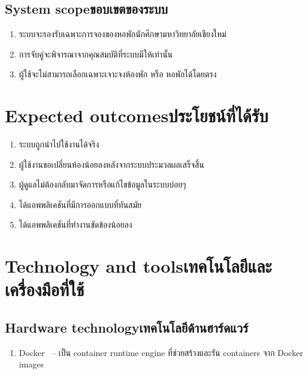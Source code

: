 \subsection{\ifenglish System scope\else ขอบเขตของระบบ\fi}
\begin{enumerate}
    \item ระบบจะรองรับเฉพาะการจองของหอพักนักศึกษามหาวิทยาลัยเชียงใหม่
    \item การจับคู่จะพิจารณาจากคุณสมบัติที่ระบบมีให้เท่านั้น
    \item ผู้ใช้จะไม่สามารถเลือกเฉพาะเจาะจงห้องพัก หรือ หอพักได้โดยตรง
\end{enumerate}

\section{\ifenglish Expected outcomes\else ประโยชน์ที่ได้รับ\fi}
\begin{enumerate}
    \item ระบบถูกนำไปใช้งานได้จริง
    \item ผู้ใช้งานขอเปลี่ยนห้องน้อยลงหลังจากระบบประมวลผลเสร็จสิ้น
    \item ผู้ดูแลไม่ต้องกลับมาจัดการหรือแก้ไขข้อมูลในระบบบ่อยๆ
    \item ได้แอพพลิเคชันที่มีการออกแบบที่ทันสมัย
    \item ได้แอพพลิเคชันที่ทำงานขัดข้องน้อยลง
\end{enumerate}

\section{\ifenglish Technology and tools\else เทคโนโลยีและเครื่องมือที่ใช้\fi}

\subsection{\ifenglish Hardware technology\else เทคโนโลยีด้านฮาร์ดแวร์\fi}
\begin{enumerate}
    \item Docker~\cite{dke} -- เป็น container runtime engine ที่ช่วยสร้างและรัน containers จาก Docker images
\end{enumerate}

